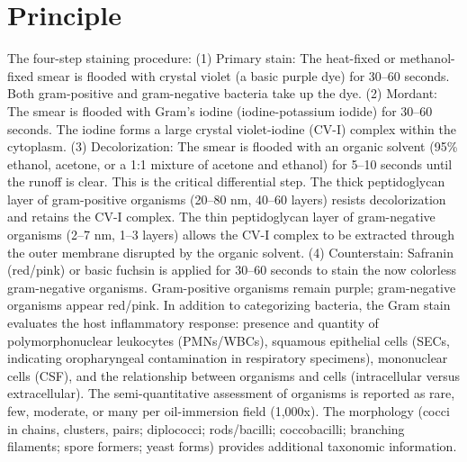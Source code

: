 \section*{Principle}
The four-step staining procedure: (1) Primary stain: The heat-fixed or methanol-fixed smear is flooded with crystal violet (a basic purple dye) for 30--60 seconds. Both gram-positive and gram-negative bacteria take up the dye. (2) Mordant: The smear is flooded with Gram's iodine (iodine-potassium iodide) for 30--60 seconds. The iodine forms a large crystal violet-iodine (CV-I) complex within the cytoplasm. (3) Decolorization: The smear is flooded with an organic solvent (95\% ethanol, acetone, or a 1:1 mixture of acetone and ethanol) for 5--10 seconds until the runoff is clear. This is the critical differential step. The thick peptidoglycan layer of gram-positive organisms (20--80 nm, 40--60 layers) resists decolorization and retains the CV-I complex. The thin peptidoglycan layer of gram-negative organisms (2--7 nm, 1--3 layers) allows the CV-I complex to be extracted through the outer membrane disrupted by the organic solvent. (4) Counterstain: Safranin (red/pink) or basic fuchsin is applied for 30--60 seconds to stain the now colorless gram-negative organisms. Gram-positive organisms remain purple; gram-negative organisms appear red/pink. In addition to categorizing bacteria, the Gram stain evaluates the host inflammatory response: presence and quantity of polymorphonuclear leukocytes (PMNs/WBCs), squamous epithelial cells (SECs, indicating oropharyngeal contamination in respiratory specimens), mononuclear cells (CSF), and the relationship between organisms and cells (intracellular versus extracellular). The semi-quantitative assessment of organisms is reported as rare, few, moderate, or many per oil-immersion field (1,000x). The morphology (cocci in chains, clusters, pairs; diplococci; rods/bacilli; coccobacilli; branching filaments; spore formers; yeast forms) provides additional taxonomic information.

